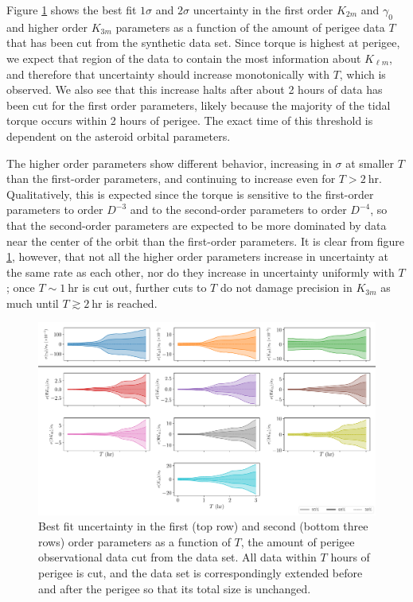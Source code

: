 \documentclass{aastex631}
\newcommand{\siunit}[1]{\ \textrm{#1}}
\begin{document}
Figure \ref{fig:observation-gap} shows the best fit $1\sigma$ and $2\sigma$ uncertainty in the first order $K_{2m}$ and $\gamma_0$ and higher order $K_{3m}$ parameters as a function of the amount of perigee data $T$ that has been cut from the synthetic data set. Since torque is highest at perigee, we expect that region of the data to contain the most information about $K_{\ell m}$, and therefore that uncertainty should increase monotonically with $T$, which is observed. We also see that this increase halts after about 2 hours of data has been cut for the first order parameters, likely because the majority of the tidal torque occurs within 2 hours of perigee. The exact time of this threshold is dependent on the asteroid orbital parameters.

The higher order parameters show different behavior, increasing in $\sigma$ at smaller $T$ than the first-order parameters, and continuing to increase even for $T>2\siunit{hr}$. Qualitatively, this is expected since the torque is sensitive to the first-order parameters to order $D^{-3}$ and to the second-order parameters to order $D^{-4}$, so that the second-order parameters are expected to be more dominated by data near the center of the orbit than the first-order parameters. It is clear from figure \ref{fig:observation-gap}, however, that not all the higher order parameters increase in uncertainty at the same rate as each other, nor do they increase in uncertainty uniformly with $T$; once $T\sim 1 \siunit{hr}$ is cut out, further cuts to $T$ do not damage precision in $K_{3m}$ as much until $T\gtrsim 2\siunit{hr}$ is reached.


\begin{figure}
  \centering
  \includegraphics[width=\textwidth]{observation-gap.pdf}
  \caption{Best fit uncertainty in the first (top row) and second (bottom three rows) order parameters as a function of $T$, the amount of perigee observational data cut from the data set. All data within $T$ hours of perigee is cut, and the data set is correspondingly extended before and after the perigee so that its total size is unchanged.}
  \label{fig:observation-gap}
\end{figure}
\end{document}
